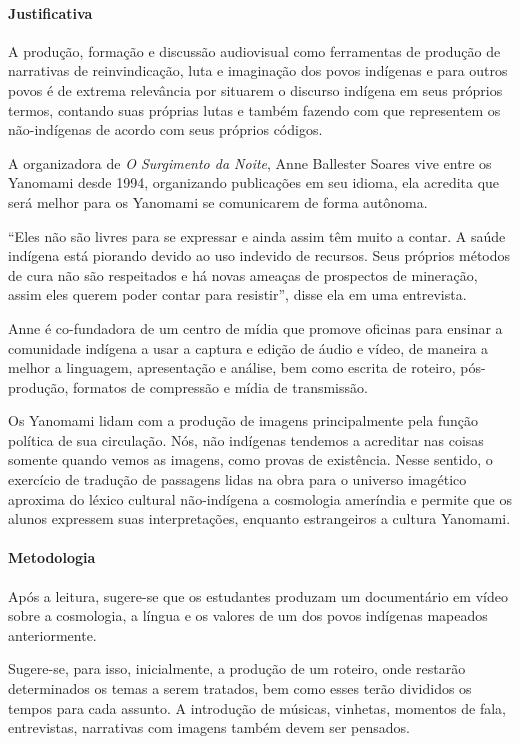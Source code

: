 \documentclass[12pt]{extarticle}
\begin{document}
\paragraph{Justificativa} A produção, formação e discussão audiovisual como ferramentas 
de produção de narrativas de reinvindicação, luta e imaginação dos povos indígenas e para 
outros povos é de extrema relevância por situarem o discurso indígena em seus próprios 
termos, contando suas próprias lutas e também fazendo com que representem os não-indígenas 
de acordo com seus próprios códigos.

A organizadora de \textit{O Surgimento da Noite}, Anne Ballester Soares vive entre os Yanomami 
desde 1994, organizando publicações em seu idioma, ela acredita que será melhor para os Yanomami 
se comunicarem de forma autônoma.

``Eles não são livres para se expressar e ainda assim têm muito a contar. A saúde indígena está 
piorando devido ao uso indevido de recursos. Seus próprios métodos de cura não são respeitados e 
há novas ameaças de prospectos de mineração, assim eles querem poder contar para resistir'', disse 
ela em uma entrevista.

Anne é co-fundadora de um centro de mídia que promove oficinas para ensinar a comunidade indígena a 
usar a captura e edição de áudio e vídeo, de maneira a melhor a linguagem, apresentação e análise, 
bem como escrita de roteiro, pós-produção, formatos de compressão e mídia de transmissão.

Os Yanomami lidam com a produção de imagens principalmente pela função política de sua circulação.
Nós, não indígenas tendemos a acreditar nas coisas somente quando vemos as imagens, como provas de 
existência. Nesse sentido, o exercício de tradução de passagens lidas na obra para o universo imagético 
aproxima do léxico cultural não-indígena a cosmologia ameríndia e permite que os alunos expressem
suas interpretações, enquanto estrangeiros a cultura Yanomami. 

\paragraph{Metodologia}

Após a leitura, sugere-se que os estudantes produzam um
documentário em vídeo sobre a cosmologia, a língua e os valores de um dos
povos indígenas mapeados anteriormente. 

Sugere-se, para isso, inicialmente, a produção de um roteiro, onde restarão 
determinados os temas a serem tratados, bem como esses terão divididos os 
tempos para cada assunto. A introdução de músicas, vinhetas, momentos de fala,
entrevistas, narrativas com imagens também devem ser pensados.
\end{document}
